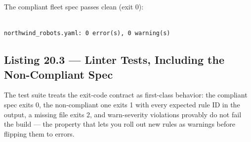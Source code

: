 The compliant fleet spec passes clean (exit 0):

\begin{verbatim}

northwind_robots.yaml: 0 error(s), 0 warning(s)
\end{verbatim}

\subsection{Listing 20.3 --- Linter Tests, Including the Non-Compliant Spec}
\label{sec:ch20-listing-linter-tests}

The test suite treats the exit-code contract as first-class behavior: the
compliant spec exits 0, the non-compliant one exits 1 with every expected
rule ID in the output, a missing file exits 2, and warn-severity
violations provably do not fail the build --- the property that lets you
roll out new rules as warnings before flipping them to errors.

